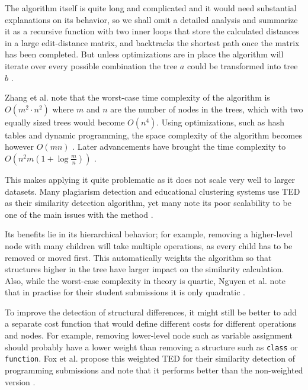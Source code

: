 The algorithm itself is quite long and complicated and it would need substantial explanations on its behavior, so we shall omit a detailed analysis and summarize it as a recursive function with two inner loops that store the calculated distances in a large edit-distance matrix, and backtracks the shortest path once the matrix has been completed. But unless optimizations are in place the algorithm will iterate over every possible combination the tree $a$ could be transformed into tree $b$ \cite{zhang-et-al-1989, ted-tutorial-2018}.

Zhang et al. note that the worst-case time complexity of the algorithm is $O(m^2\cdot n^2)$ where $m$ and $n$ are the number of nodes in the trees, which with two equally sized trees would become $O(n^4)$. Using optimizations, such as hash tables and dynamic programming, the space complexity of the algorithm becomes however $O(mn)$ \cite{zhang-et-al-1989, ted-tutorial-2018}. Later advancements have brought the time complexity to $O(n^2m(1+\log \frac{m}{n}))$ \cite{ted-demaine}.

This makes applying it quite problematic as it does not scale very well to larger datasets. Many plagiarism detection and educational clustering systems use TED as their similarity detection algorithm, yet many note its poor scalability to be one of the main issues with the method
\cite{stanford-million, fox-clust-leverage-2015, fox-roy-autostyle-msc-2016}. 

Its benefits lie in its hierarchical behavior; for example, removing a higher-level node with many children will take multiple operations, as every child has to be removed or moved first. This automatically weights the algorithm so that structures higher in the tree have larger impact on the similarity calculation. Also, while the worst-case complexity in theory is quartic, Nguyen et al. note that in practise for their student submissions it is only quadratic \cite{stanford-million}.

To improve the detection of structural differences, it might still be better to add a separate cost function that would define different costs for different operations and nodes. For example, removing lower-level node such as variable assignment should probably have a lower weight than removing a structure such as \texttt{class} or \texttt{function}. Fox et al. propose this weighted TED for their similarity detection of programming submissions and note that it performs better than the non-weighted version \cite{fox-clust-leverage-2015}.

